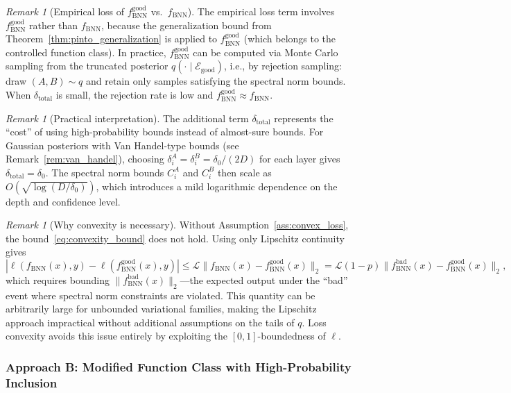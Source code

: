 \documentclass{article}
\theoremstyle{plain}
\theoremstyle{definition}
\theoremstyle{remark}
\newtheorem{remark}[theorem]{Remark}
\begin{document}
\begin{remark}[Empirical loss of $f_{\mathrm{BNN}}^{\mathrm{good}}$ vs.\ $f_{\mathrm{BNN}}$]
The empirical loss term involves $f_{\mathrm{BNN}}^{\mathrm{good}}$ rather than $f_{\mathrm{BNN}}$, because the generalization bound from Theorem~\ref{thm:pinto_generalization} is applied to $f_{\mathrm{BNN}}^{\mathrm{good}}$ (which belongs to the controlled function class). In practice, $f_{\mathrm{BNN}}^{\mathrm{good}}$ can be computed via Monte Carlo sampling from the truncated posterior $q(\cdot \mid \mathcal{E}_{\text{good}})$, i.e., by rejection sampling: draw $(A,B) \sim q$ and retain only samples satisfying the spectral norm bounds. When $\delta_{\text{total}}$ is small, the rejection rate is low and $f_{\mathrm{BNN}}^{\mathrm{good}} \approx f_{\mathrm{BNN}}$.
\end{remark}

\begin{remark}[Practical interpretation]
The additional term $\delta_{\text{total}}$ represents the ``cost'' of using high-probability bounds instead of almost-sure bounds. For Gaussian posteriors with Van Handel-type bounds (see Remark~\ref{rem:van_handel}), choosing $\delta_i^A = \delta_i^B = \delta_0 / (2D)$ for each layer gives $\delta_{\text{total}} = \delta_0$. The spectral norm bounds $C_i^A$ and $C_i^B$ then scale as $O(\sqrt{\log(D/\delta_0)})$, which introduces a mild logarithmic dependence on the depth and confidence level.
\end{remark}

\begin{remark}[Why convexity is necessary]
\label{rem:why_convexity}
Without Assumption~\ref{ass:convex_loss}, the bound~\eqref{eq:convexity_bound} does not hold. Using only Lipschitz continuity gives
\[
|\ell(f_{\mathrm{BNN}}(x), y) - \ell(f_{\mathrm{BNN}}^{\mathrm{good}}(x), y)| \le \mathcal{L}\|f_{\mathrm{BNN}}(x) - f_{\mathrm{BNN}}^{\mathrm{good}}(x)\|_2 = \mathcal{L}(1-p)\|f_{\mathrm{BNN}}^{\mathrm{bad}}(x) - f_{\mathrm{BNN}}^{\mathrm{good}}(x)\|_2,
\]
which requires bounding $\|f_{\mathrm{BNN}}^{\mathrm{bad}}(x)\|_2$---the expected output under the ``bad'' event where spectral norm constraints are violated. This quantity can be arbitrarily large for unbounded variational families, making the Lipschitz approach impractical without additional assumptions on the tails of $q$. Loss convexity avoids this issue entirely by exploiting the $[0,1]$-boundedness of $\ell$.
\end{remark}


\subsubsection{Approach B: Modified Function Class with High-Probability Inclusion}
\end{document}
